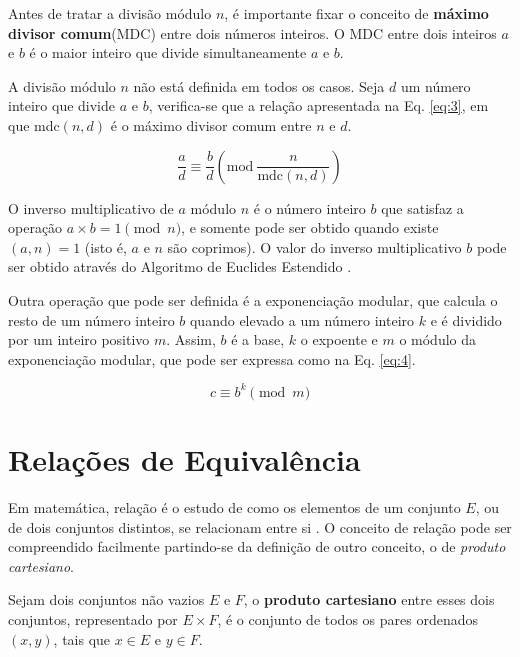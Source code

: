 Antes de tratar a divisão módulo \(n\), é importante fixar o conceito de \textbf{máximo divisor comum}(MDC) entre dois números inteiros. O MDC entre dois inteiros \(a\) e \(b\) 
é o maior inteiro que divide simultaneamente \(a\) e \(b\).

A divisão módulo $n$ não está definida em todos os casos. Seja \(d\) um número inteiro que divide \(a\) e \(b\), verifica-se que a relação apresentada na Eq. \ref{eq:3}, em que mdc\((n, d)\) é o máximo divisor comum entre \(n\) e \(d\).

\begin{equation}
  \frac{a}{d} \equiv \frac{b}{d}\left(\mbox{mod}\ \frac{n}{\text{mdc}(n,d)}\right) \label{eq:3}
\end{equation}

O inverso multiplicativo de $a$ módulo \(n\) é o número inteiro \(b\) que satisfaz a operação \(a \times b = 1 \pmod  n\), e somente pode ser obtido quando existe \((a, n) = 1\) (isto é, \(a\) e \(n\) são coprimos). O valor do inverso multiplicativo \(b\) pode ser obtido através do Algoritmo de Euclides Estendido \cite{Halim:2013}.

\par Outra operação que pode ser definida é a exponenciação modular, que calcula o resto de um número inteiro \(b\) quando elevado a um número inteiro \(k\) e é dividido por um inteiro positivo \(m\). Assim, $b$ é a base, $k$ o expoente e $m$ o módulo da exponenciação modular, que pode ser expressa como na Eq. \ref{eq:4}.

\begin{equation}
  c \equiv b^k\pmod m \label{eq:4}
\end{equation}


%
%
\section{Relações de Equivalência}
\label{relacoes_equivalencia}

Em matemática, relação é o estudo de como os elementos de um conjunto $E$, ou de dois conjuntos distintos, se relacionam entre si \cite{Domingues:2003}. O conceito de relação pode ser compreendido facilmente partindo-se da definição de outro conceito, o de \textit{produto cartesiano}.

Sejam dois conjuntos não vazios \(E\) e \(F\), o \textbf{produto cartesiano} entre esses dois conjuntos, representado por \(E \times F\), é o conjunto de todos os pares ordenados \((x, y)\), tais que \(x \in E\) e \(y \in F\).

